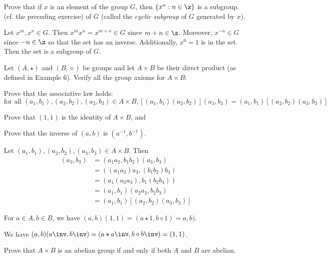 \begin{problems}
    \item Prove that if $x$ is an element of the group $G$, then $\{x^n : n \in \z \}$ is a subgroup. (cf. the preceding exercise) of $G$ (called the \textit{cyclic subgroup} of $G$ generated by $x$).
    \begin{sol}
        Let $x^m, x^n \in G$. Then $x^mx^n = x^{m + n} \in G$ since $m + n \in \z$. Moreover, $x^{-n} \in G$ since $-n \in \z$ so that the set has an inverse. Additionally, $x^0 = 1$ is in the set. Then the set is a subgroup of $G$.
    \end{sol}
    \item Let $(A, \star)$ and $(B, \diamond)$ be groups and let $A \times B$ be their direct product
    (as defined in Example 6). Verify all the group axioms for $A \times B$:
    \begin{problems}
        \item[(a)] Prove that the associative law holds:
        $$\text{for all } (a_1, b_1), (a_2, b_2), (a_3, b_3) \in A \times B,
        [(a_1, b_1)(a_2, b_2)](a_3, b_3) = (a_1, b_1)[(a_2, b_2)(a_3, b_3)]$$
        \item Prove that $(1, 1)$ is the identity of $A \times B$, and
        \item Prove that the inverse of $(a, b)$ is $(a^{-1}, b^{-1})$.
    \end{problems}
    \begin{solalph}
        \item Let $(a_1, b_1), (a_2, b_2), (a_3, b_3) \in A \times B$. Then
        \begin{align*}
            [(a_1, b_1)(a_2, b_2)](a_3, b_3) & = (a_1a_2, b_1b_2)(a_3, b_3) \\
            & = ((a_1a_2)a_3, (b_1b_2)b_3) \\
            & = (a_1(a_2a_3), b_1(b_2b_3)) \\
            & = (a_1,b_1)(a_2a_3, b_2b_3) \\
            & = (a_1, b_1)[(a_2, b_2)(a_3, b_3)]
        \end{align*}
        \item For $a \in A, b \in B$, we have $(a, b)(1, 1) = (a \star 1, b \diamond 1) = a, b)$.
        \item We have $(a, b)(a\inv, b\inv) = (a \star a\inv, b \diamond b\inv) = (1, 1)$.
    \end{solalph}
    \item Prove that $A \times B$ is an abelian group if and only if both $A$ and $B$ are abelian.
    \begin{sol}

\end{sol}
\end{problems}
